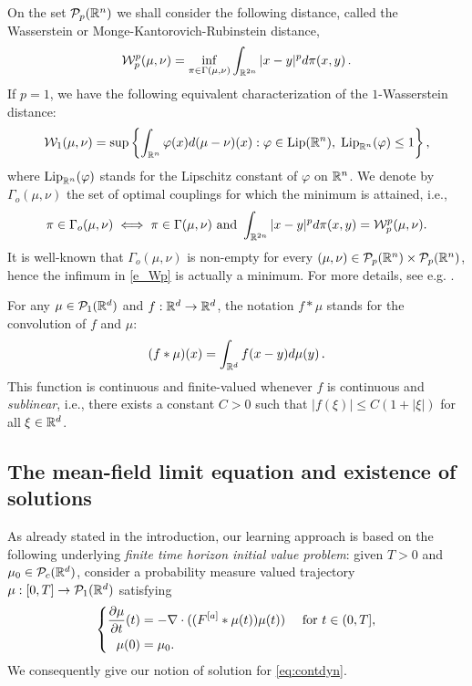 On the set $\mathcal{P}_p(\mathbb{R}^n)$ we shall consider the following distance, called the Wasserstein or Monge-Kantorovich-Rubinstein distance,
\begin{align}  \label{e_Wp}
\mathcal{W}^p_p(\mu,\nu)=\inf_{\pi \in \Gamma(\mu,\nu)} \int_{\mathbb{R}^{2n}} |x-y|^p d \pi(x,y)\,.
\end{align}
If $p = 1$, we have the following equivalent characterization of the $1$-Wasserstein distance:
\begin{align}\label{dualwass}
\mathcal{W}_1(\mu,\nu)=\sup \left \{ \int_{\mathbb{R}^n} \varphi(x) d (\mu-\nu)(x)  : \varphi \in \textup{Lip}(\mathbb{R}^n), \; \textup{Lip}_{\mathbb{R}^n}(\varphi) \leq 1 \right \},
\end{align}
where $\textup{Lip}_{\mathbb{R}^n}(\varphi)$ stands for the Lipschitz constant of $\varphi$ on $\mathbb{R}^n$. We denote by $\Gamma_o(\mu,\nu)$ the set of optimal couplings for which the minimum is attained, i.e.,
\begin{align*}
\pi \in \Gamma_o(\mu, \nu) \iff \pi \in \Gamma(\mu, \nu) \text{ and } \int_{\mathbb{R}^{2n}} | x - y |^p d \pi(x,y) = \mathcal{W}^p_p(\mu,\nu).
\end{align*}
It is well-known that $\Gamma_o(\mu, \nu)$ is non-empty for every $(\mu,\nu) \in \mathcal{P}_p(\mathbb{R}^n)\times\mathcal{P}_p(\mathbb{R}^n)$, hence the infimum in \eqref{e_Wp} is actually a minimum. For more details, see e.g. \cite{AGS,villani}.

For any $\mu \in \mathcal{P}_1(\mathbb{R}^d)$ and $f: \mathbb{R}^d \to \mathbb{R}^d$, the notation $f * \mu$ stands for the convolution of $f$ and $\mu$:
\begin{align*}
(f * \mu)(x) = \int_{\mathbb{R}^d} f(x-y) d\mu(y)\,.
\end{align*}
This function is continuous and finite-valued whenever $f$ is continuous and \emph{sublinear}, i.e., there exists a constant $C > 0$ such that $| f(\xi) | \leq C (1 + |\xi|)$ for all $\xi \in \mathbb{R}^d$.

\subsection{The mean-field limit equation and existence of solutions}

As already stated in the introduction, our learning approach is based on the following underlying \textit{finite time horizon initial value problem}: given $T > 0$ and $\mu_0 \in \mathcal{P}_c(\mathbb{R}^d)$, consider a probability measure valued trajectory $\mu:[0,T]\rightarrow \mathcal{P}_1(\mathbb{R}^d)$ satisfying 
\begin{align}\label{eq:contdyn}
\left\{\begin{aligned}
\frac{\partial \mu}{\partial t}(t) &= -\nabla \cdot ((F^{[a]}*\mu(t))\mu(t)) \quad \text{ for } t \in (0,T],\\
\mu(0) &=\mu_0.
\end{aligned}\right.
\end{align}
We consequently give our notion of solution for \eqref{eq:contdyn}.

